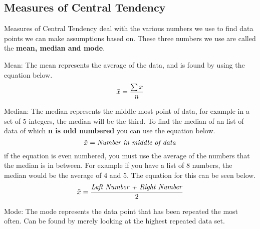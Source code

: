     \subsection{Measures of Central Tendency}
    Measures of Central Tendency deal with the various numbers we use to find data points we can make assumptions based on.
    These three numbers we use are called the \textbf{mean, median and mode}.
    \begin{definition}
        Mean: The mean represents the average of the data, and is found by using the equation below.
        \begin{equation*}
            \bar{x} = \frac{\sum x}{n}
        \end{equation*}
    \end{definition}
    \begin{definition}
        Median: The median represents the middle-most point of data, for example in a set of 5 integers, the median will be the third.
        To find the median of an list of data of which \textbf{n is odd numbered} you can use the equation below.
        \begin{equation*}
            \tilde{x} = \mbox{\emph{Number in middle of data}}
        \end{equation*}
        if the equation is even numbered, you must use the average of the numbers that the median is in between.
        For example if you have a list of 8 numbers, the median would be the average of 4 and 5.
        The equation for this can be seen below.
        \begin{equation*}
            \tilde{x} = \frac{\mbox{\emph{Left Number + Right Number}}}{2}
        \end{equation*}
    \end{definition}
    \begin{definition}
        Mode: The mode represents the data point that has been repeated the most often. Can be found by merely looking at the highest repeated data set.    
    \end{definition}
    
